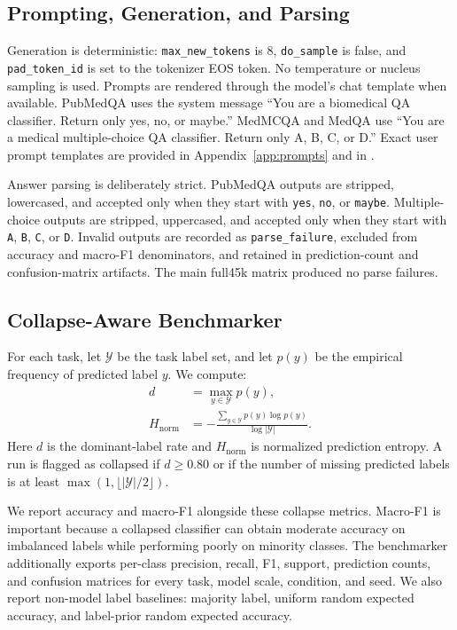 \documentclass[11pt]{article}
\begin{document}
\subsection{Prompting, Generation, and Parsing}

Generation is deterministic: \texttt{max\_new\_tokens} is 8, \texttt{do\_sample} is false, and \texttt{pad\_token\_id} is set to the tokenizer EOS token. No temperature or nucleus sampling is used. Prompts are rendered through the model's chat template when available. PubMedQA uses the system message ``You are a biomedical QA classifier. Return only yes, no, or maybe.'' MedMCQA and MedQA use ``You are a medical multiple-choice QA classifier. Return only A, B, C, or D.'' Exact user prompt templates are provided in Appendix~\ref{app:prompts} and in .

Answer parsing is deliberately strict. PubMedQA outputs are stripped, lowercased, and accepted only when they start with \texttt{yes}, \texttt{no}, or \texttt{maybe}. Multiple-choice outputs are stripped, uppercased, and accepted only when they start with \texttt{A}, \texttt{B}, \texttt{C}, or \texttt{D}. Invalid outputs are recorded as \texttt{parse\_failure}, excluded from accuracy and macro-F1 denominators, and retained in prediction-count and confusion-matrix artifacts. The main full45k matrix produced no parse failures.

\subsection{Collapse-Aware Benchmarker}

For each task, let $\mathcal{Y}$ be the task label set, and let $p(y)$ be the empirical frequency of predicted label $y$. We compute:
\begin{align}
d &= \max_{y \in \mathcal{Y}} p(y),\\
H_{\mathrm{norm}} &= -\frac{\sum_{y\in\mathcal{Y}} p(y)\log p(y)}{\log |\mathcal{Y}|}.
\end{align}
Here $d$ is the dominant-label rate and $H_{\mathrm{norm}}$ is normalized prediction entropy. A run is flagged as collapsed if $d \geq 0.80$ or if the number of missing predicted labels is at least $\max(1,\lfloor |\mathcal{Y}|/2 \rfloor)$.

We report accuracy and macro-F1 alongside these collapse metrics. Macro-F1 is important because a collapsed classifier can obtain moderate accuracy on imbalanced labels while performing poorly on minority classes. The benchmarker additionally exports per-class precision, recall, F1, support, prediction counts, and confusion matrices for every task, model scale, condition, and seed. We also report non-model label baselines: majority label, uniform random expected accuracy, and label-prior random expected accuracy.
\end{document}
